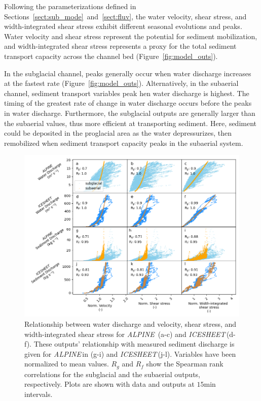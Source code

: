 \documentclass[draft]{agujournal2019}
\newcommand{\alpine}{\textit{ALPINE}\,}
\newcommand{\icesheet}{\textit{ICESHEET}\,}
\newcommand{\unit}[1]{$\mathrm{#1}$}
\begin{document}
Following the parameterizations defined in Sections~\ref{sect:sub_mode}~and~\ref{sect:fluv}, the water velocity, shear stress, and width-integrated shear stress exhibit different seasonal evolutions and peaks.
Water velocity and shear stress represent the potential for sediment mobilization, and width-integrated shear stress represents a proxy for the total sediment transport capacity across the channel bed (Figure~\ref{fig:model_outs}).

In the subglacial channel, peaks generally occur when water discharge increases at the fastest rate (Figure~\ref{fig:model_outs}).
Alternatively, in the subaerial channel,  sediment transport variables peak  hen water discharge is highest.
The timing of the greatest rate of change in water discharge occurs before the peaks in water discharge.
Furthermore, the subglacial outputs are generally larger than the subaerial values, thus more efficient at transporting sediment.
Here, sediment could be deposited in the proglacial area as the water depressurizes, then remobilized when sediment transport capacity peaks in the subaerial system.

\begin{figure}[h]
  \centering
  \includegraphics[width=0.9\linewidth]{Fig3.png}
  \caption{
    Relationship between water discharge and velocity, shear stress, and width-integrated shear stress for \alpine{} (a-c) and \icesheet (d-f).
    These outputs' relationship with measured sediment discharge is given for \alpine in (g-i) and \icesheet (j-l).
    Variables have been normalized to mean values.
    $R_g$ and $R_f$ show the Spearman rank correlations for the subglacial and the subaerial outputs, respectively.
    Plots are shown with data and outputs at $15$\unit{min} intervals.
  }
  \label{fig:Qw_vari}
\end{figure}
\end{document}
